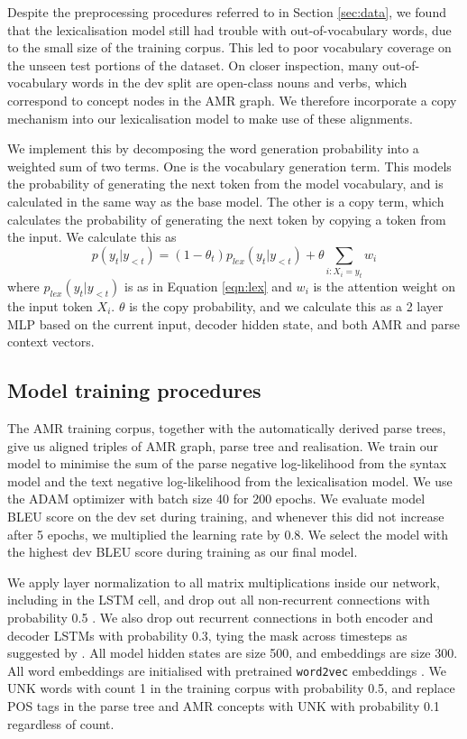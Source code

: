 Despite the preprocessing procedures referred to in Section \ref{sec:data}, we found that the lexicalisation model still had trouble with out-of-vocabulary words, due to the small size of the training corpus. This led to poor vocabulary coverage on the unseen test portions of the dataset. On closer inspection, many out-of-vocabulary words in the dev split are open-class nouns and verbs, which correspond to concept nodes in the AMR graph. We therefore incorporate a copy mechanism \citep{Vinyals:15b,See:17} into our lexicalisation model to make use of these alignments.

We implement this by decomposing the word generation probability into a weighted sum of two terms. One is the vocabulary generation term. This models the probability of generating the next token from the model vocabulary, and is calculated in the same way as the base model. The other is a copy term, which calculates the probability of generating the next token by copying a token from the input. We calculate this as
\begin{equation}
    p(y_t | y_{<t}) = (1 - \theta_t)p_{lex}(y_t | y_{<t}) + \theta \sum_{i : X_i = y_t} w_i
\end{equation}
where $p_{lex}(y_t | y_{<t})$ is as in Equation \ref{eqn:lex} and $w_i$ is the attention weight on the input token $X_i$. $\theta$ is the copy probability, and we calculate this as a 2 layer MLP based on the current input, decoder hidden state, and both AMR and parse context vectors.

\subsection{Model training procedures}

The AMR training corpus, together with the automatically derived parse trees, give us aligned triples of AMR graph, parse tree and realisation. We train our model to minimise the sum of the parse negative log-likelihood from the syntax model and the text negative log-likelihood from the lexicalisation model. We use the ADAM optimizer \citep{Kingma:15} with batch size 40 for 200 epochs. We evaluate model BLEU score on the dev set during training, and whenever this did not increase after 5 epochs, we multiplied the learning rate by 0.8. We select the model with the highest dev BLEU score during training as our final model.

We apply layer normalization \citep{Ba:16} to all matrix multiplications inside our network, including in the LSTM cell, and drop out all non-recurrent connections with probability 0.5 \citep{Srivastava:14}. We also drop out recurrent connections in both encoder and decoder LSTMs with probability 0.3, tying the mask across timesteps as suggested by \citet{Gal:16}. All model hidden states are size 500, and embeddings are size 300. All word embeddings are initialised with pretrained \texttt{word2vec} embeddings \citep{Mikolov:13}. We UNK words with count 1 in the training corpus with probability 0.5, and replace POS tags in the parse tree and AMR concepts with UNK with probability 0.1 regardless of count.

